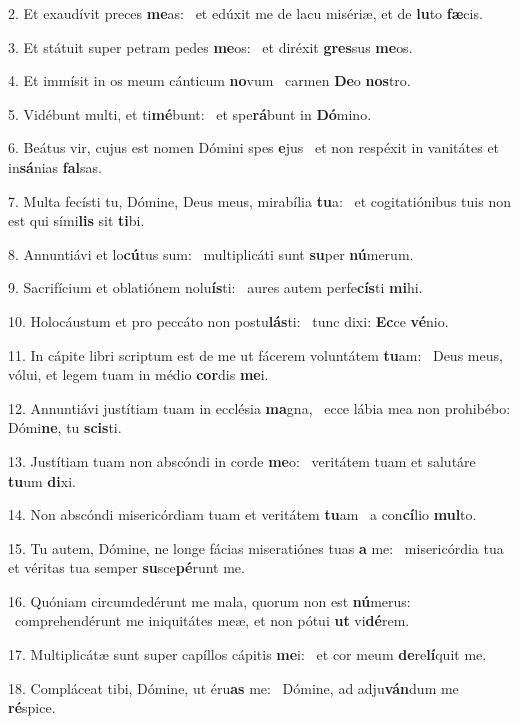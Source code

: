 2. Et exaudívit preces \textbf{me}as: \ast\  et edúxit me de lacu misériæ, et de \textbf{lu}to \textbf{fæ}cis.\

3. Et státuit super petram pedes \textbf{me}os: \ast\  et diréxit \textbf{gres}sus \textbf{me}os.\

4. Et immísit in os meum cánticum \textbf{no}vum \ast\  carmen \textbf{De}o \textbf{nos}tro.\

5. Vidébunt multi, et ti\textbf{mé}bunt: \ast\  et spe\textbf{rá}bunt in \textbf{Dó}mino.\

6. Beátus vir, cujus est nomen Dómini spes \textbf{e}jus \ast\  et non respéxit in vanitátes et in\textbf{sá}nias \textbf{fal}sas.\

7. Multa fecísti tu, Dómine, Deus meus, mirabília \textbf{tu}a: \ast\  et cogitatiónibus tuis non est qui sími\textbf{lis} sit \textbf{ti}bi.\

8. Annuntiávi et lo\textbf{cú}tus sum: \ast\  multiplicáti sunt \textbf{su}per \textbf{nú}merum.\

9. Sacrifícium et oblatiónem nolu\textbf{ís}ti: \ast\  aures autem perfe\textbf{cís}ti \textbf{mi}hi.\

10. Holocáustum et pro peccáto non postu\textbf{lás}ti: \ast\  tunc dixi: \textbf{Ec}ce \textbf{vé}nio.\

11. In cápite libri scriptum est de me ut fácerem voluntátem \textbf{tu}am: \ast\  Deus meus, vólui, et legem tuam in médio \textbf{cor}dis \textbf{me}i.\

12. Annuntiávi justítiam tuam in ecclésia \textbf{ma}gna, \ast\  ecce lábia mea non prohibébo: Dómi\textbf{ne}, tu \textbf{scis}ti.\

13. Justítiam tuam non abscóndi in corde \textbf{me}o: \ast\  veritátem tuam et salutáre \textbf{tu}um \textbf{di}xi.\

14. Non abscóndi misericórdiam tuam et veritátem \textbf{tu}am \ast\  a con\textbf{cí}lio \textbf{mul}to.\

15. Tu autem, Dómine, ne longe fácias miseratiónes tuas \textbf{a} me: \ast\  misericórdia tua et véritas tua semper \textbf{su}sce\textbf{pé}runt me.\

16. Quóniam circumdedérunt me mala, quorum non est \textbf{nú}merus: \ast\  comprehendérunt me iniquitátes meæ, et non pótui \textbf{ut} vi\textbf{dé}rem.\

17. Multiplicátæ sunt super capíllos cápitis \textbf{me}i: \ast\  et cor meum \textbf{de}re\textbf{lí}quit me.\

18. Compláceat tibi, Dómine, ut éru\textbf{as} me: \ast\  Dómine, ad adju\textbf{ván}dum me \textbf{ré}spice.\

